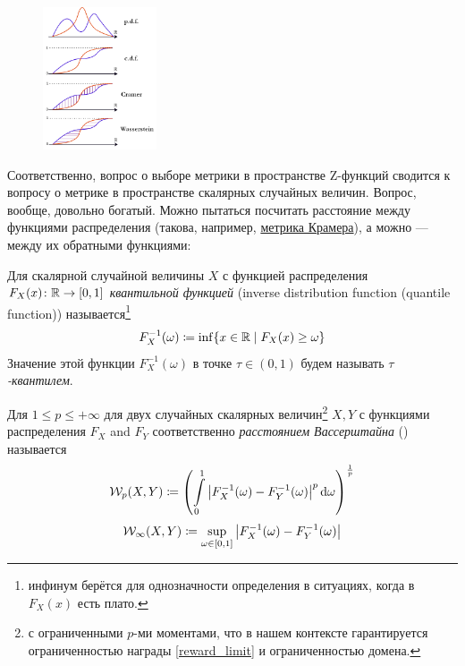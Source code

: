 \begin{figure}
\vspace{-0.5cm}
\centering
\includegraphics[width=0.3\textwidth]{Images/Wasserstein.png}
\vspace{-5cm}
\end{figure}

Соответственно, вопрос о выборе метрики в пространстве Z-функций сводится к вопросу о метрике в пространстве скалярных случайных величин. Вопрос, вообще, довольно богатый. Можно пытаться посчитать расстояние между функциями распределения (такова, например, \href{https://en.wikipedia.org/wiki/Energy_distance}{метрика Крамера}), а можно --- между их обратными функциями:

\begin{definition}
Для скалярной случайной величины $X$ с функцией распределения $F_X(x) \colon \mathbb{R} \to [0, 1]$ \emph{квантильной функцией} (inverse distribution function (quantile function)) называется\footnote{инфинум берётся для однозначности определения в ситуациях, когда в $F_X(x)$ есть плато.}
$$F^{-1}_X(\omega) \coloneqq \inf\{ x \in \mathbb{R} \mid F_X(x) \ge \omega \}$$
Значение этой функции $F^{-1}_X(\omega)$ в точке $\tau \in (0, 1)$ будем называть \emph{$\tau$-квантилем}. 
\end{definition}

\begin{definition}
Для $1 \le p \le +\infty$ для двух случайных скалярных величин\footnote{с ограниченными $p$-ми моментами, что в нашем контексте гарантируется ограниченностью награды \eqref{reward_limit} и ограниченностью домена.} $X, Y$ с функциями распределения $F_X$ and $F_Y$ соответственно \emph{расстоянием Вассерштайна} () называется
\begin{equation}\label{wasserstein}
    \mathcal{W}_p(X, Y) \coloneqq \left( \int\limits_0^1 \left| F_X^{-1}(\omega) - F_Y^{-1}(\omega) \right| ^p \mathop{}\!\mathrm{d} \omega \right)^{\frac{1}{p}}
\end{equation}
$$\mathcal{W}_\infty(X, Y) \coloneqq \sup_{\omega \in [0,1]} \left| F_X^{-1}(\omega) - F_Y^{-1}(\omega) \right| $$
\end{definition}

